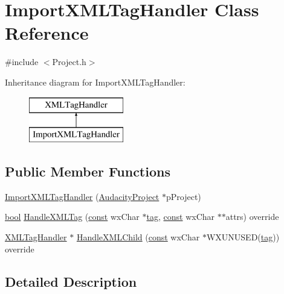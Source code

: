 \hypertarget{class_import_x_m_l_tag_handler}{}\section{Import\+X\+M\+L\+Tag\+Handler Class Reference}
\label{class_import_x_m_l_tag_handler}


{\ttfamily \#include $<$Project.\+h$>$}

Inheritance diagram for Import\+X\+M\+L\+Tag\+Handler\+:\begin{figure}[H]
\begin{center}
\leavevmode
\includegraphics[height=2.000000cm]{class_import_x_m_l_tag_handler}
\end{center}
\end{figure}
\subsection*{Public Member Functions}
\begin{DoxyCompactItemize}
\item 
\hyperlink{class_import_x_m_l_tag_handler_ad1a94bf8c4fe45ca467ad91028dde1d1}{Import\+X\+M\+L\+Tag\+Handler} (\hyperlink{class_audacity_project}{Audacity\+Project} $\ast$p\+Project)
\item 
\hyperlink{mac_2config_2i386_2lib-src_2libsoxr_2soxr-config_8h_abb452686968e48b67397da5f97445f5b}{bool} \hyperlink{class_import_x_m_l_tag_handler_aa02d1d8f0fb0a22ffdcf2215fb291d6b}{Handle\+X\+M\+L\+Tag} (\hyperlink{getopt1_8c_a2c212835823e3c54a8ab6d95c652660e}{const} wx\+Char $\ast$\hyperlink{structtag}{tag}, \hyperlink{getopt1_8c_a2c212835823e3c54a8ab6d95c652660e}{const} wx\+Char $\ast$$\ast$attrs) override
\item 
\hyperlink{class_x_m_l_tag_handler}{X\+M\+L\+Tag\+Handler} $\ast$ \hyperlink{class_import_x_m_l_tag_handler_aba4b15b068f725930e0e02a338267b56}{Handle\+X\+M\+L\+Child} (\hyperlink{getopt1_8c_a2c212835823e3c54a8ab6d95c652660e}{const} wx\+Char $\ast$W\+X\+U\+N\+U\+S\+ED(\hyperlink{structtag}{tag})) override
\end{DoxyCompactItemize}


\subsection{Detailed Description}


